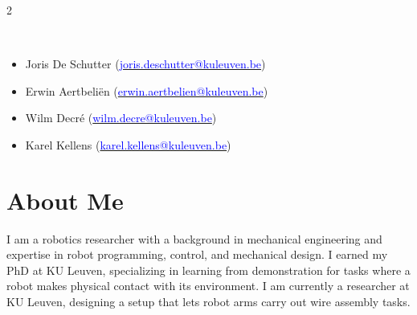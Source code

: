 \documentclass[lighthipster]{simplehipstercv}
\begin{document}
\begin{paracol}{2}
{			\bigskip
			\bigskip

			\\[0.5em]
			\begin{itemize}[leftmargin=1em, itemsep=0pt, topsep=0pt]
				\item Joris De Schutter (\href{mailto:joris.deschutter@kuleuven.be}{\textcolor{blue}{joris.deschutter@kuleuven.be}})
				\item Erwin Aertbeli\"en (\href{mailto:erwin.aertbelien@kuleuven.be}{\textcolor{blue}{erwin.aertbelien@kuleuven.be}})
				\item Wilm Decr\'{e} (\href{mailto:wilm.decre@kuleuven.be}{\textcolor{blue}{wilm.decre@kuleuven.be}})
				\item Karel Kellens (\href{mailto:karel.kellens@kuleuven.be}{\textcolor{blue}{karel.kellens@kuleuven.be}})
			\end{itemize}
			\vspace{0em} %


		}
		\switchcolumn

		\small

		\section*{About Me}
		\large I am a robotics researcher with a background in mechanical engineering and expertise in robot programming, control, and mechanical design. I earned my PhD at KU Leuven, specializing in learning from demonstration for tasks where a robot makes physical contact with its environment. I am currently a researcher at KU Leuven, designing a setup that lets robot arms carry out wire assembly tasks.
		\vspace{-0.1cm}



\end{paracol}
\end{document}
